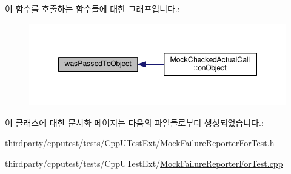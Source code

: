 이 함수를 호출하는 함수들에 대한 그래프입니다.\+:
\nopagebreak
\begin{figure}[H]
\begin{center}
\leavevmode
\includegraphics[width=348pt]{class_mock_expected_calls_list_a9a3f1eec5ad45ccae942edb3073279de_icgraph}
\end{center}
\end{figure}




이 클래스에 대한 문서화 페이지는 다음의 파일들로부터 생성되었습니다.\+:\begin{DoxyCompactItemize}
\item 
thirdparty/cpputest/tests/\+Cpp\+U\+Test\+Ext/\hyperlink{_mock_failure_reporter_for_test_8h}{Mock\+Failure\+Reporter\+For\+Test.\+h}\item 
thirdparty/cpputest/tests/\+Cpp\+U\+Test\+Ext/\hyperlink{_mock_failure_reporter_for_test_8cpp}{Mock\+Failure\+Reporter\+For\+Test.\+cpp}\end{DoxyCompactItemize}
